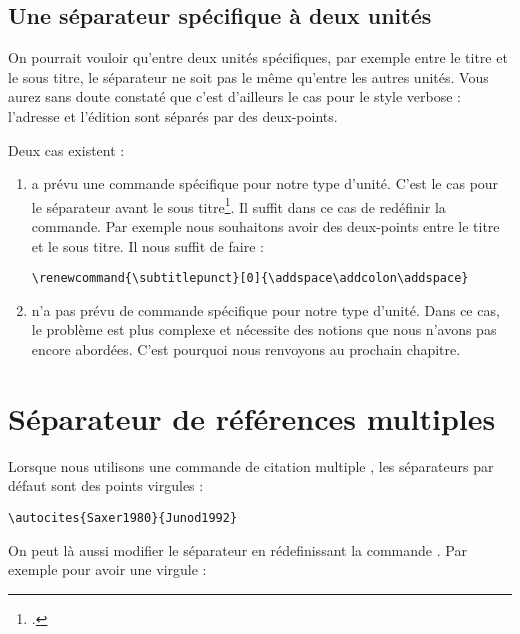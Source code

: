 	
\subsection{Une séparateur spécifique à deux unités}
	
	On pourrait vouloir qu'entre deux unités spécifiques, par exemple entre le titre et le sous titre, le séparateur ne soit pas le même qu'entre les autres unités.	Vous aurez sans doute constaté que c'est d'ailleurs le cas pour le style verbose : l'adresse et l'édition sont séparés par des deux-points.
	
	Deux cas existent :
		\begin{enumerate}
			\item {} a prévu une commande spécifique pour notre type d'unité. C'est le cas pour le séparateur avant le sous titre\footcite[Ces commandes sont peu nombreuse : on les trouvera dans]{biblatex_hooks}. Il suffit dans ce cas de redéfinir la commande. Par exemple nous souhaitons avoir des deux-points entre le titre et le sous titre. Il nous suffit de faire :
			\begin{verbatim}
\renewcommand{\subtitlepunct}[0]{\addspace\addcolon\addspace}
			\end{verbatim}
			
			\item {} n'a pas prévu de commande spécifique pour notre type d'unité. Dans ce cas, le problème est plus complexe et nécessite des notions que nous n'avons pas encore abordées. C'est pourquoi nous renvoyons au prochain chapitre.
		\end{enumerate}
		
\section{Séparateur de références multiples}\label{multicitedelim}

Lorsque nous utilisons une commande de citation multiple , les séparateurs par défaut sont des points virgules :

\begin{verbatim}
\autocites{Saxer1980}{Junod1992}
\end{verbatim}

\begin{quotation}
\cites{Saxer1980}{Junod1992}
\end{quotation}

On peut là aussi modifier le séparateur en rédefinissant la commande . Par exemple pour avoir une virgule :

